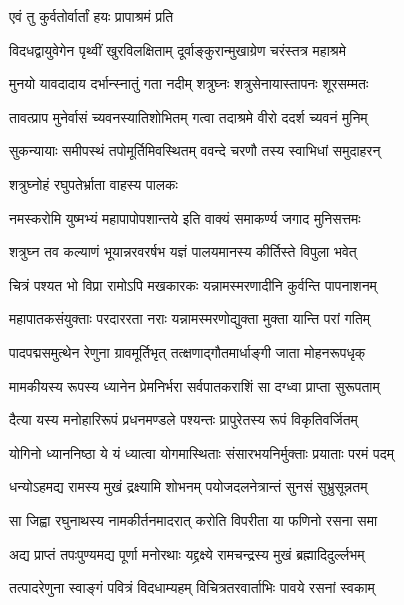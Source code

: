 

\onelineshloka
{एवं तु कुर्वतोर्वार्तां हयः प्रापाश्रमं प्रति}%

\twolineshloka
{विदधद्वायुवेगेन पृथ्वीं खुरविलक्षिताम्}
{दूर्वाङ्कुरान्मुखाग्रेण चरंस्तत्र महाश्रमे}%

\twolineshloka
{मुनयो यावदादाय दर्भान्स्नातुं गता नदीम्}
{शत्रुघ्नः शत्रुसेनायास्तापनः शूरसम्मतः}%

\twolineshloka
{तावत्प्राप मुनेर्वासं च्यवनस्यातिशोभितम्}
{गत्वा तदाश्रमे वीरो ददर्श च्यवनं मुनिम्}%

\twolineshloka
{सुकन्यायाः समीपस्थं तपोमूर्तिमिवस्थितम्}
{ववन्दे चरणौ तस्य स्वाभिधां समुदाहरन्}%

\onelineshloka
{शत्रुघ्नोहं रघुपतेर्भ्राता वाहस्य पालकः}%

\twolineshloka
{नमस्करोमि युष्मभ्यं महापापोपशान्तये}
{इति वाक्यं समाकर्ण्य जगाद मुनिसत्तमः}%

\twolineshloka
{शत्रुघ्न तव कल्याणं भूयान्नरवरर्षभ}
{यज्ञं पालयमानस्य कीर्तिस्ते विपुला भवेत्}%

\twolineshloka
{चित्रं पश्यत भो विप्रा रामोऽपि मखकारकः}
{यन्नामस्मरणादीनि कुर्वन्ति पापनाशनम्}%

\twolineshloka
{महापातकसंयुक्ताः परदाररता नराः}
{यन्नामस्मरणोद्युक्ता मुक्ता यान्ति परां गतिम्}%

\twolineshloka
{पादपद्मसमुत्थेन रेणुना ग्रावमूर्तिभृत्}
{तत्क्षणाद्गौतमार्धाङ्गी जाता मोहनरूपधृक्}%

\twolineshloka
{मामकीयस्य रूपस्य ध्यानेन प्रेमनिर्भरा}
{सर्वपातकराशिं सा दग्ध्वा प्राप्ता सुरूपताम्}%

\twolineshloka
{दैत्या यस्य मनोहारिरूपं प्रधनमण्डले}
{पश्यन्तः प्रापुरेतस्य रूपं विकृतिवर्जितम्}%

\twolineshloka
{योगिनो ध्याननिष्ठा ये यं ध्यात्वा योगमास्थिताः}
{संसारभयनिर्मुक्ताः प्रयाताः परमं पदम्}%

\twolineshloka
{धन्योऽहमद्य रामस्य मुखं द्रक्ष्यामि शोभनम्}
{पयोजदलनेत्रान्तं सुनसं सुभ्रुसून्नतम्}%

\twolineshloka
{सा जिह्वा रघुनाथस्य नामकीर्तनमादरात्}
{करोति विपरीता या फणिनो रसना समा}%

\twolineshloka
{अद्य प्राप्तं तपःपुण्यमद्य पूर्णा मनोरथाः}
{यद्द्रक्ष्ये रामचन्द्रस्य मुखं ब्रह्मादिदुर्ल्लभम्}%

\twolineshloka
{तत्पादरेणुना स्वाङ्गं पवित्रं विदधाम्यहम्}
{विचित्रतरवार्ताभिः पावये रसनां स्वकाम्}%

